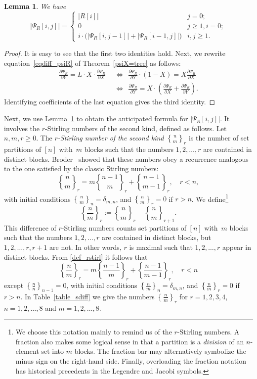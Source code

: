 \documentclass[a4paper,11pt,UKenglish]{article}
\newcommand{\Lin}{L}
\newcommand{\ddy}[1]{\displaystyle{\frac{\partial{#1}}{\partial Y}}}
\newcommand{\ddx}[1]{\displaystyle{\frac{\partial{#1}}{\partial X}}}
\newcommand{\stirl}[3]{\genfrac{\{}{\}}{0pt}{}{{#1}}{{#2}}_{{#3}}}
\newcommand{\sdiff}[3]{\genfrac{\{}{\}}{}{}{{#1}}{{#2}}_{{#3}}}
\newtheorem{lemma}[theorem]{Lemma}
\theoremstyle{definition}
\begin{document}
\begin{lemma}\label{lemma_recursion_psiR}
  We have
  \begin{equation*}
    |\Psi_R[i,j]|=
    \begin{cases}
      |R[i]| & j=0;\\
      0 & j\ge 1,i=0;\\
      i\cdot\bigl(|\Psi_R[i,j-1]|+|\Psi_R[i-1,j]|\bigr) & i,j\ge 1.
    \end{cases}
  \end{equation*}
\end{lemma}
\begin{proof}
  It is easy to see that the first two identities hold.  Next, we
  rewrite equation~\eqref{eqdiff_psiR} of Theorem~\ref{psiX=tree} as
  follows:
  \begin{align*}
    \ddy{\Psi_R} = \Lin\cdot X\cdot \ddx{\Psi_R} 
    &\;\,\iff\;\, \ddy{\Psi_R}\cdot (1-X) = X\ddx{\Psi_R} \\
    &\;\,\iff\;\, \ddy{\Psi_R} = X\cdot \left(\ddx{\Psi_R}+\ddy{\Psi_R}\right).
  \end{align*}
  Identifying coefficients of the last equation gives the third
  identity.
\end{proof}

Next, we use Lemma~\ref{lemma_recursion_psiR} to obtain the
anticipated formula for $|\Psi_R[i,j]|$. It involves the
$r$-Stirling numbers of the second kind, defined as follows.
Let $n,m,r\ge 0$. The \emph{$r$-Stirling number of the second kind}
$\stirl{n}{m}{r}$ is the number of set partitions of $[n]$ with~$m$
blocks such that the numbers $1,2,\ldots,r$ are contained in distinct
blocks. Broder~\cite[Theorem 2]{Br} showed that these numbers obey a
recurrence analogous to the one satisfied by the classic
Stirling numbers:
\begin{equation}\label{def_rstirl}
\stirl{n}{m}{r}=m\stirl{n-1}{m}{r}+\stirl{n-1}{m-1}{r}, \quad r < n,
\end{equation}
with initial conditions $\stirl{n}{m}{n}=\delta_{m,n}$, and $\stirl{n}{m}{r}=0$ if $r>n$.
We define\footnote{We choose this notation mainly to remind us
  of the $r$-Stirling numbers. A fraction also makes some logical sense
  in that a partition is a \emph{division} of an $n$-element set into
  $m$ blocks. The fraction bar may alternatively symbolize the minus
  sign on the right-hand side. Finally, overloading the fraction
  notation has historical precedents in the Legendre and Jacobi
  symbols.}
$$
\sdiff{n}{m}{r}:=\stirl{n}{m}{r}-\stirl{n}{m}{r+1}.
$$
This difference of $r$-Stirling numbers
counts set partitions of $[n]$ with~$m$ blocks such that the numbers
$1,2,\ldots,r$
are contained in distinct blocks, but $1,2,\ldots,r,r+1$ are not.
In other words, $r$ is maximal such that $1,2,\ldots,r$ appear in
distinct blocks. From \eqref{def_rstirl} it follows that
\begin{equation}\label{sdiff_rec}
  \sdiff{n}{m}{r}=m\sdiff{n-1}{m}{r}+\sdiff{n-1}{m-1}{r}, \quad r < n
\end{equation}
except $\sdiff{n}{n}{n-1}=0$, with initial conditions
$\sdiff{n}{m}{n}=\delta_{m,n}$, and $\sdiff{n}{m}{r}=0$ if $r>n$.
In Table~\ref{table_sdiff} we give the numbers $\sdiff{n}{m}{r}$ for
$r = 1,2,3,4$, $n=1,2,\ldots,8$ and $m=1,2,\ldots,8$.
\end{document}
